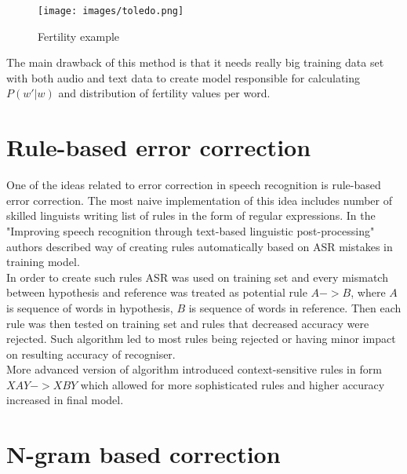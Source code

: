 \documentclass[a4paper,11pt,twoside]{report}
\theoremstyle{definition}
\begin{document}
\begin{figure}[H]{}
    \centering
    \texttt{[image: images/toledo.png]}
    \caption{Fertility example}
    \label{img:toledo}
\end{figure}

The main drawback of this method is that it needs really big training data set with both audio and text data to create model responsible for calculating $P(w'|w)$ and distribution of fertility values per word.


\section{Rule-based error correction}

One of the ideas related to error correction in speech recognition is rule-based error correction. The most naive implementation of this idea includes number of skilled linguists writing list of rules in the form of regular expressions. In the "Improving speech recognition through text-based linguistic post-processing" \cite{ErrRules} authors described way of creating rules automatically based on ASR mistakes in training model. \\
In order to create such rules ASR was used on training set and every mismatch between hypothesis and reference was treated as potential rule $A->B$, where $A$ is sequence of words in hypothesis, $B$ is sequence of words in reference. Then each rule was then tested on training set and rules that decreased accuracy were rejected. Such algorithm led to most rules being rejected or having minor impact on resulting accuracy of recogniser.\\
More advanced version of algorithm introduced context-sensitive rules in form $XAY->XBY$ which allowed for more sophisticated rules and higher accuracy increased in final model. 


\section{N-gram based correction}
\end{document}
